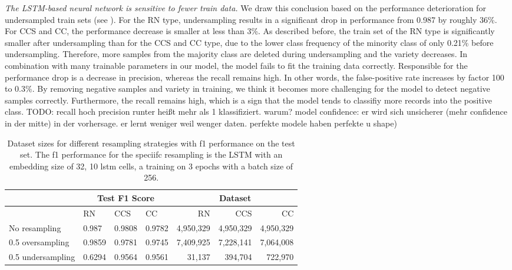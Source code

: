 \textit{The LSTM-based neural network is sensitive to fewer train data.} We draw this conclusion based on the performance deterioration for undersampled train sets (see ). For the RN type, undersampling results in a significant drop in performance from 0.987 by roughly 36\%. For CCS and CC, the performance decrease is smaller at less than 3\%. As described before, the train set of the RN type is significantly smaller after undersampling than for the CCS and CC type, due to the lower class frequency of the minority class of only 0.21\% before undersampling. Therefore, more samples from the majority class are deleted during undersampling and the variety decreases. In combination with many trainable parameters in our model, the model fails to fit the training data correctly. 
Responsible for the performance drop is a decrease in precision, whereas the recall remains high. In other words, the false-positive rate increases by factor 100 to 0.3\%. By removing negative samples and variety in training, we think it becomes more challenging for the model to detect negative samples correctly. Furthermore, the recall remains high, which is a sign that the model tends to classifiy more records into the positive class.
TODO: recall hoch precision runter heißt mehr als 1 klassifiziert.  warum? model confidence: er wird sich unsicherer (mehr confidence in der mitte) in der vorhersage. er lernt weniger weil wenger daten. perfekte modele haben perfekte u shape)


\begin{table}[]
    \tabcolsep=0.11cm
    \begin{tabularx}{\textwidth}{lXXX|rrr}
    \toprule
                        & \multicolumn{3}{c}{Test F1 Score} & \multicolumn{3}{c}{Dataset}   \\ \midrule
                        & RN        & CCS        & CC     & RN            & CCS         & CC          \\ \midrule
    No resampling     &  0.987   &  0.9808    &  0.9782  &  4,950,329    & 4,950,329   & 4,950,329   \\
    0.5 oversampling  &  0.9859   &  0.9781   &  0.9745  &  7,409,925    & 7,228,141   & 7,064,008   \\
    0.5 undersampling &  0.6294   &  0.9564   &  0.9561  &  31,137       & 394,704     & 722,970     \\ \bottomrule
    \end{tabularx}
    \caption{Dataset sizes for different resampling strategies with f1 performance on the test set. The f1 performance for the speciifc resampling is the LSTM with an embedding size of 32, 10 lstm cells, a training on 3 epochs with a batch size of 256.}
    \label{tab:resampling_size_performance_lstm}
\end{table}


